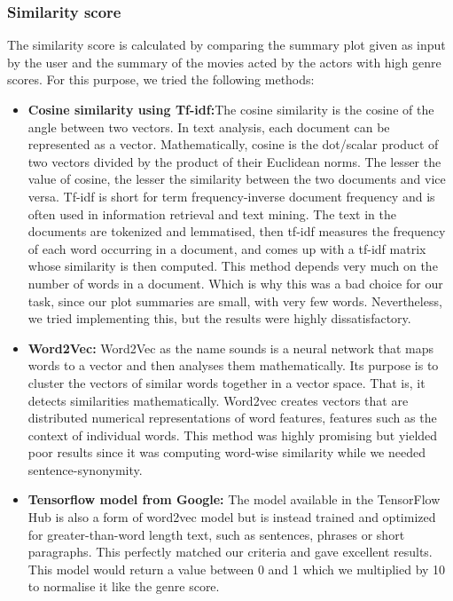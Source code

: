 \subsubsection{Similarity score}
The similarity score is calculated by comparing the summary plot given as input by the user and the summary of the movies acted by the actors with high genre scores. For this purpose, we tried the following methods:

\begin{itemize}
    \item \textbf{Cosine similarity using Tf-idf:}The cosine similarity is the cosine of the angle between two vectors. In text analysis, each document can be represented as a vector. Mathematically, cosine is the dot/scalar product of two vectors divided by the product of their Euclidean norms. The lesser the value of cosine, the lesser the similarity between the two documents and vice versa. Tf-idf is short for term frequency-inverse document frequency and is often used in information retrieval and text mining. The text in the documents are tokenized and lemmatised, then tf-idf measures the frequency of each word occurring in a document, and comes up with a tf-idf matrix whose similarity is then computed. This method depends very much on the number of words in a document. Which is why this was a bad choice for our task, since our plot summaries are small, with very few words. Nevertheless, we tried implementing this, but the results were highly dissatisfactory.    
    \item \textbf{Word2Vec: }Word2Vec as the name sounds is a neural network that maps words to a vector and then analyses them mathematically. Its purpose is to cluster the vectors of similar words together in a vector space. That is, it detects similarities mathematically. Word2vec creates vectors that are distributed numerical representations of word features, features such as the context of individual words. This  method  was  highly  promising  but  yielded  poor  results since it was computing word-wise similarity while we needed sentence-synonymity.
    \item \textbf{Tensorflow model from Google: }The model \cite{TFHubModel} available in the TensorFlow Hub is also a form of word2vec model but is instead trained and optimized for greater-than-word length text, such as sentences, phrases or short paragraphs. This perfectly matched our criteria and gave excellent results. This model would return a value between 0 and 1 which we multiplied by 10 to normalise it like the genre score.
\end{itemize}

